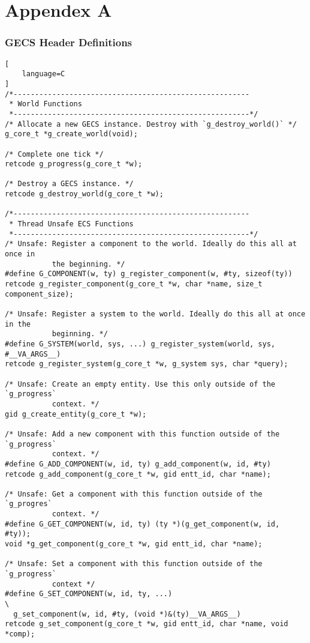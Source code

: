 \appendix
\section{Appendex A}
\label{appendix:a}

\subsubsection{GECS Header Definitions}
\begin{lstlisting}[
    language=C
]
/*-------------------------------------------------------
 * World Functions
 *-------------------------------------------------------*/
/* Allocate a new GECS instance. Destroy with `g_destroy_world()` */
g_core_t *g_create_world(void);

/* Complete one tick */
retcode g_progress(g_core_t *w);

/* Destroy a GECS instance. */
retcode g_destroy_world(g_core_t *w);

/*-------------------------------------------------------
 * Thread Unsafe ECS Functions
 *-------------------------------------------------------*/
/* Unsafe: Register a component to the world. Ideally do this all at once in
           the beginning. */
#define G_COMPONENT(w, ty) g_register_component(w, #ty, sizeof(ty))
retcode g_register_component(g_core_t *w, char *name, size_t component_size);

/* Unsafe: Register a system to the world. Ideally do this all at once in the
           beginning. */
#define G_SYSTEM(world, sys, ...) g_register_system(world, sys, #__VA_ARGS__)
retcode g_register_system(g_core_t *w, g_system sys, char *query);

/* Unsafe: Create an empty entity. Use this only outside of the `g_progress`
           context. */
gid g_create_entity(g_core_t *w);

/* Unsafe: Add a new component with this function outside of the `g_progress`
           context. */
#define G_ADD_COMPONENT(w, id, ty) g_add_component(w, id, #ty)
retcode g_add_component(g_core_t *w, gid entt_id, char *name);

/* Unsafe: Get a component with this function outside of the `g_progres`
           context. */
#define G_GET_COMPONENT(w, id, ty) (ty *)(g_get_component(w, id, #ty));
void *g_get_component(g_core_t *w, gid entt_id, char *name);

/* Unsafe: Set a component with this function outside of the `g_progress`
           context */
#define G_SET_COMPONENT(w, id, ty, ...)                                        \
  g_set_component(w, id, #ty, (void *)&(ty)__VA_ARGS__)
retcode g_set_component(g_core_t *w, gid entt_id, char *name, void *comp);


\end{lstlisting}
